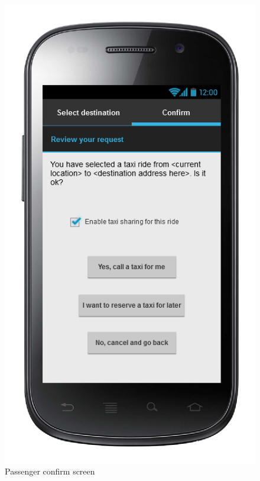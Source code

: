 \begin{figure} [h]
\centering
  	  \includegraphics[scale=0.5]{ui/Passenger confirm screen.png}
\caption{Passenger confirm screen}
  
	\end{figure}
